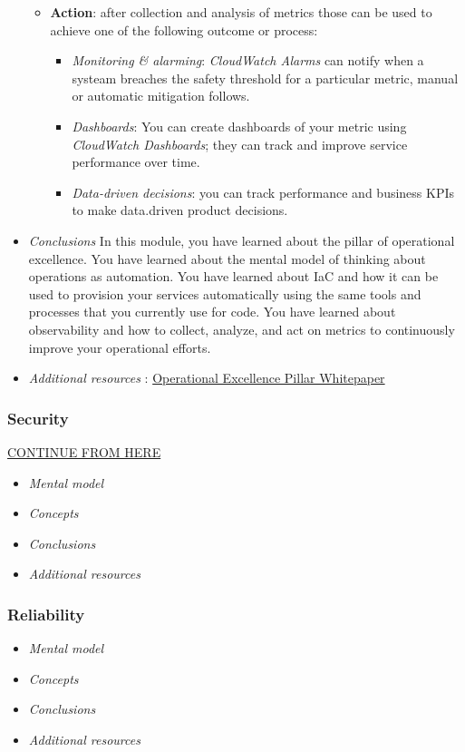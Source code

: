 \documentclass{article}
\theoremstyle{definition}
\begin{document}
\begin{itemize}
\begin{itemize}
    \item \textbf{Action}: after collection and analysis of metrics those can be used to achieve one of the following outcome or process:
    \begin{itemize}
    \item \textit{Monitoring \& alarming}: \textit{CloudWatch Alarms} can notify when a systeam breaches the safety threshold for a particular metric, manual or automatic mitigation follows.
    \item \textit{Dashboards}: You can create dashboards of your metric using \textit{CloudWatch Dashboards}; they can track and improve service performance over time.
    \item \textit{Data-driven decisions}: you can track performance and business KPIs to make data.driven product decisions.
    \end{itemize}
    \end{itemize}
    \item \textit{Conclusions} In this module, you have learned about the pillar of operational excellence. You have learned about the mental model of thinking about operations as automation. You have learned about IaC and how it can be used to provision your services automatically using the same tools and processes that you currently use for code. You have learned about observability and how to collect, analyze, and act on metrics to continuously improve your operational efforts.
    \item \textit{Additional resources} : \href{https://d1.awsstatic.com/whitepapers/architecture/AWS-Operational-Excellence-Pillar.pdf?e=gs2020&p=fundcore}{Operational Excellence Pillar Whitepaper}
\end{itemize}

\subsubsection{Security}
\href{https://aws.amazon.com/getting-started/fundamentals-core-concepts/?nc1=h_ls}{CONTINUE FROM HERE}
\begin{itemize}
    \item \textit{Mental model}
    \item \textit{Concepts}
    \item \textit{Conclusions}
    \item \textit{Additional resources}
\end{itemize}

\subsubsection{Reliability}
\begin{itemize}
    \item \textit{Mental model}
    \item \textit{Concepts}
    \item \textit{Conclusions}
    \item \textit{Additional resources}
\end{itemize}
\end{document}

